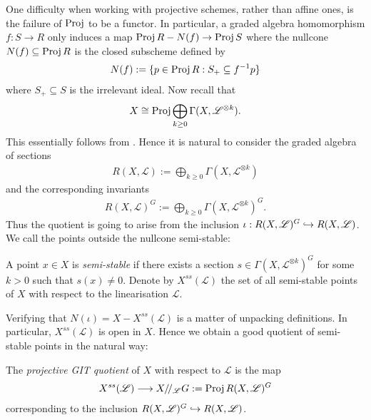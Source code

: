 \documentclass[12pt]{ociamthesis}  %
\begin{document}
One difficulty when working with projective schemes, rather
than affine ones, is the failure of $\operatorname{Proj}$ to be a functor. In particular,
a graded algebra homomorphism $f : S \to R$ only induces a map
$\operatorname{Proj} R - N(f) \to \operatorname{Proj} S$ where the nullcone $N(f)\subseteq\operatorname{Proj} R$ is the closed
subscheme defined by \missingcitation
\begin{align*}
  N(f) := \{ p \in \operatorname{Proj} R : S_+ \subseteq f^{-1}p\}
\end{align*}
where $S_+\subseteq S$ is the irrelevant ideal.
Now recall that
\begin{align*}
  X \cong \operatorname{Proj}\bigoplus_{k\geq 0}\Gamma(X,\mathscr L^{\otimes k}).
\end{align*}
This essentially follows from \cite[Proposition 13.48]{gortz2010}. Hence
it is natural to consider the graded algebra of sections
\begin{align*}
  R(X,\mathscr L) := \bigoplus_{k\geq 0}\Gamma(X,\mathscr L^{\otimes k})
\end{align*}
and the corresponding invariants
\begin{align*}
  R(X,\mathscr L)^G := \bigoplus_{k\geq 0}\Gamma(X,\mathscr L^{\otimes k})^G.
\end{align*}
Thus the quotient is going to arise from the inclusion
$\iota : R(X,\mathscr L)^G\hookrightarrow R(X,\mathscr L)$. We call the points outside the nullcone
semi-stable:

\begin{definition}
  A point $x\in X$ is \emph{semi-stable} if there exists a section
  $s\in\Gamma(X,\mathscr L^{\otimes k})^G$ for some $k>0$ such that $s(x)\neq 0$.
  Denote by $X^{ss}(\mathscr L)$ the set of all semi-stable points of $X$
  with respect to the linearisation $\mathscr L$.
\end{definition}

Verifying that $N(\iota) = X - X^{ss}(\mathscr L)$ is a matter of unpacking definitions.
In particular, $X^{ss}(\mathscr L)$ is open in $X$. Hence we obtain a good quotient
of semi-stable points in the natural way:

\begin{definition}
  The \emph{projective GIT quotient} of $X$ with respect to $\mathscr L$ is the map
  \begin{align*}
    X^{ss}(\mathscr L) \longrightarrow X /\!/_{\mathscr L} G := \operatorname{Proj} R(X,{\mathscr L})^G
  \end{align*}
  corresponding to the inclusion $R(X,{\mathscr L})^G\hookrightarrow R(X,{\mathscr L})$.
\end{definition}
\end{document}
